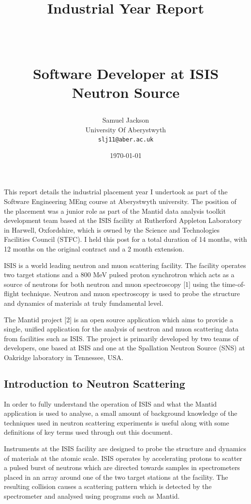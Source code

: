 \documentclass[paper=a4, fontsize=11pt]{scrartcl}	%
\title{
	\vspace{-1in} 	\usefont{OT1}{bch}{b}{n}
	\huge \strut Industrial Year Report \strut \\
	\Large \bfseries \strut Software Developer at ISIS Neutron Source \strut
}
\author{
	\usefont{OT1}{bch}{m}{n} Samuel Jackson
	\\ \usefont{OT1}{bch}{m}{n} University Of Aberystwyth
	\\   \texttt{slj11@aber.ac.uk}
}
\date{\today}
\numberwithin{equation}{section}															%
\numberwithin{figure}{section}																%
\numberwithin{table}{section}
\begin{document}
	\maketitle
	\clearpage
	\tableofcontents
	\clearpage

This report details the industrial placement year I undertook as part of
the Software Engineering MEng course at Aberystwyth university. The
position of the placement was a junior role as part of the Mantid data
analysis toolkit development team based at the ISIS facility at
Rutherford Appleton Laboratory in Harwell, Oxfordshire, which is owned
by the Science and Technologies Facilities Council (STFC). I held this
post for a total duration of 14 months, with 12 months on the original
contract and a 2 month extension.

ISIS is a world leading neutron and muon scattering facility. The
facility operates two target stations and a 800 MeV pulsed proton
synchrotron which acts as a source of neutrons for both neutron and muon
spectroscopy {[}1{]} using the time-of-flight technique. Neutron and
muon spectroscopy is used to probe the structure and dynamics of
materials at truly fundamental level.

The Mantid project {[}2{]} is an open source application which aims to
provide a single, unified application for the analysis of neutron and
muon scattering data from facilities such as ISIS. The project is
primarily developed by two teams of developers, one based at ISIS and
one at the Spallation Neutron Source (SNS) at Oakridge laboratory in
Tennessee, USA.

\subsection{Introduction to Neutron
Scattering}\label{introduction-to-neutron-scattering}

In order to fully understand the operation of ISIS and what the Mantid
application is used to analyse, a small amount of background knowledge
of the techniques used in neutron scattering experiments is useful along
with some definitions of key terms used through out this document.

Instruments at the ISIS facility are designed to probe the structure and
dynamics of materials at the atomic scale. ISIS operates by accelerating
protons to scatter a pulsed burst of neutrons which are directed towards
samples in spectrometers placed in an array around one of the two target
stations at the facility. The resulting collision causes a scattering
pattern which is detected by the spectrometer and analysed using
programs such as Mantid.
\end{document}
